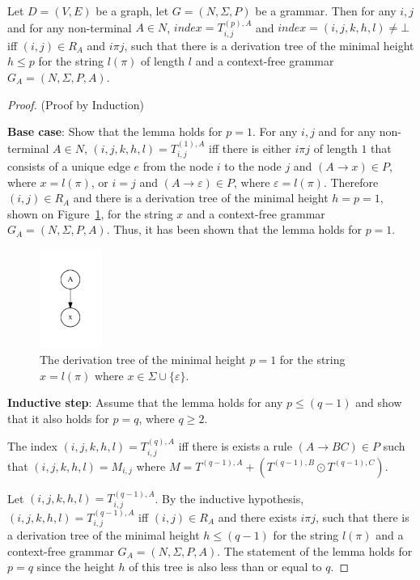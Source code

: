 \begin{lemma}\label{lemma:correctness}
	Let $D = (V,E)$ be a graph, let $G =(N,\Sigma,P)$ be a grammar. Then for any $i, j$ and for any non-terminal $A \in N$, $index = T^{(p),A}_{i,j}$ and $index = (i,j,k,h,l) \neq \bot$ iff $(i,j) \in R_A$ and $i \pi j$, such that there is a derivation tree of the minimal height $h \leq p$ for the string $l(\pi)$  of length $l$ and a context-free grammar $G_A = (N,\Sigma,P,A)$.
\end{lemma}
\begin{proof}(Proof by Induction)
	
	\textbf{Base case}: Show that the lemma holds for $p = 1$. For any $i, j$ and for any non-terminal $A \in N$, $(i,j,k,h,l) = T^{(1), A}_{i,j}$ iff there is either $i \pi j$ of length $1$ that consists of a unique edge $e$ from the node $i$ to the node $j$ and $(A \rightarrow x) \in P$, where $x = l(\pi)$, or $i = j$ and $(A \rightarrow \varepsilon) \in P$, where $\varepsilon = l(\pi)$. Therefore $(i,j) \in R_A$ and there is a derivation tree of the minimal height $h = p = 1$, shown on Figure~\ref{tree1}, for the string $x$ and a context-free grammar $G_A = (N,\Sigma,P,A)$. Thus, it has been shown that the lemma holds for $p = 1$.
	
	\begin{figure}[h!]
		\centering
		\includegraphics[width=2cm]{pictures/tree1.pdf}
		\caption{The derivation tree of the minimal height $p = 1$ for the string $x = l(\pi)$ where $x \in \Sigma \cup \{\varepsilon\}$.}
		\label{tree1}
	\end{figure}
	
	\textbf{Inductive step}: Assume that the lemma holds for any $p \leq (q - 1)$ and show that it also holds for $p = q$, where $q \geq 2$.
	
	The index $(i,j,k,h,l) = T^{(q),A}_{i,j}$ iff there is exists a rule $(A \to B C) \in P$ such that $(i,j,k,h,l) = M_{i,j}$ where $M = T^{(q-1),A} + (T^{(q-1),B} \odot T^{(q-1),C})$. 
	
	Let $(i,j,k,h,l) = T^{(q-1),A}_{i,j}$. By the inductive hypothesis, $(i,j,k,h,l) = T^{(q-1),A}_{i,j}$ iff $(i,j) \in R_A$ and there exists $i \pi j$, such that there is a derivation tree of the minimal height $h \leq (q-1)$ for the string $l(\pi)$ and a context-free grammar $G_A = (N,\Sigma,P,A)$. The statement of the lemma holds for $p = q$ since the height $h$ of this tree is also less than or equal to $q$.
	

\end{proof}
